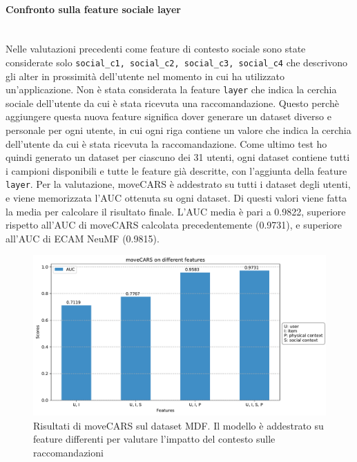 \documentclass[12pt,italian]{report}
\newcommand{\myparagraph}[1]{\paragraph{#1}\mbox{}\\} %
\begin{document}
\myparagraph{Confronto sulla feature sociale layer}
Nelle valutazioni precedenti come feature di contesto sociale sono state considerate solo \texttt{social\_c1, social\_c2, social\_c3, social\_c4} che descrivono gli alter in prossimità dell'utente nel momento in cui ha utilizzato un'applicazione. Non è stata considerata la feature \texttt{layer} che indica la cerchia sociale dell'utente da cui è stata ricevuta una raccomandazione. Questo perchè aggiungere questa nuova feature significa dover generare un dataset diverso e personale per ogni utente, in cui ogni riga contiene un valore che indica la cerchia dell'utente da cui è stata ricevuta la raccomandazione. Come ultimo test ho quindi generato un dataset per ciascuno dei 31 utenti, ogni dataset contiene tutti i campioni disponibili e tutte le feature già descritte, con l'aggiunta della feature \texttt{layer}. Per la valutazione, moveCARS è addestrato su tutti i dataset degli utenti, e viene memorizzata l'AUC ottenuta su ogni dataset. Di questi valori viene fatta la media per calcolare il risultato finale. L'AUC media è pari a 0.9822, superiore rispetto all'AUC di moveCARS calcolata precedentemente (0.9731), e superiore all'AUC di ECAM NeuMF (0.9815).

\begin{figure}
  \centering
  \includegraphics[width=\linewidth]{immagini/moveCARS_diff_features.pdf}
  \caption{Risultati di moveCARS sul dataset MDF. Il modello è addestrato su feature differenti per valutare l'impatto del contesto sulle raccomandazioni}
  \label{fig:result-movecars-mdf}
\end{figure}
\end{document}
